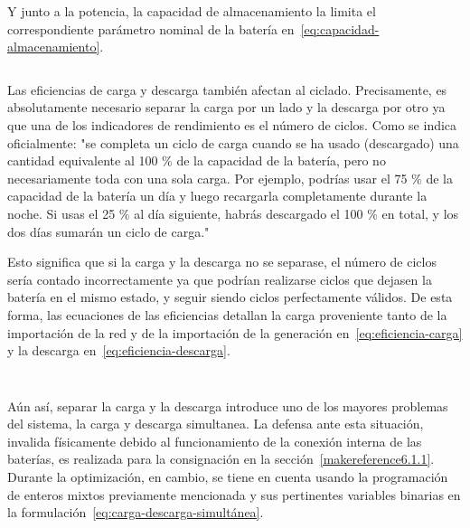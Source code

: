 \begin{equation}
  \label{eq:capacidad-potencia-carga}
\end{equation}

\begin{equation}
  \label{eq:capacidad-potencia-descarga}
\end{equation}

Y junto a la potencia, la capacidad de almacenamiento la limita el correspondiente parámetro nominal de la batería en~\ref{eq:capacidad-almacenamiento}.

\begin{equation}
  \label{eq:capacidad-almacenamiento}
\end{equation}

Las eficiencias de carga y descarga también afectan al ciclado. Precisamente, es absolutamente necesario separar la carga por un lado y la descarga por otro ya que una de los indicadores de rendimiento es el número de ciclos. Como se indica oficialmente: "se completa un ciclo de carga cuando se ha usado (descargado) una cantidad equivalente al 100 \% de la capacidad de la batería, pero no necesariamente toda con una sola carga. Por ejemplo, podrías usar el 75 \% de la capacidad de la batería un día y luego recargarla completamente durante la noche. Si usas el 25 \% al día siguiente, habrás descargado el 100 \% en total, y los dos días sumarán un ciclo de carga."

Esto significa que si la carga y la descarga no se separase, el número de ciclos sería contado incorrectamente ya que podrían realizarse ciclos que dejasen la batería en el mismo estado, y seguir siendo ciclos perfectamente válidos. De esta forma, las ecuaciones de las eficiencias detallan la carga proveniente tanto de la importación de la red y de la importación de la generación en~\ref{eq:eficiencia-carga} y la descarga en~\ref{eq:eficiencia-descarga}.

\begin{equation}
  \label{eq:eficiencia-carga}
\end{equation}

\begin{equation}
  \label{eq:eficiencia-descarga}
\end{equation}

Aún así, separar la carga y la descarga introduce uno de los mayores problemas del sistema, la carga y descarga simultanea. La defensa ante esta situación, invalida físicamente debido al funcionamiento de la conexión interna de las baterías, es realizada para la consignación en la sección~\ref{makereference6.1.1}. Durante la optimización, en cambio, se tiene en cuenta usando la programación de enteros mixtos previamente mencionada y sus pertinentes variables binarias en la formulación~\ref{eq:carga-descarga-simultánea}.


